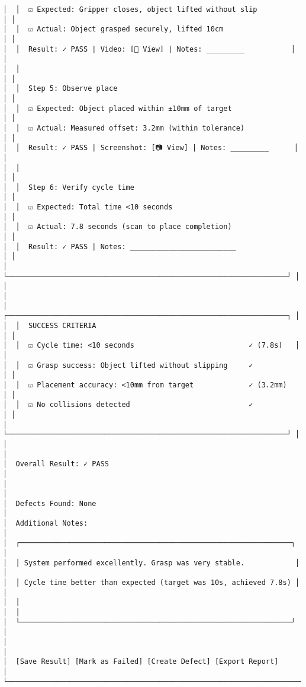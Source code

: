 \documentclass[
]{article}
\begin{document}
\begin{verbatim}
│  │  ☑ Expected: Gripper closes, object lifted without slip          │ │
│  │  ☑ Actual: Object grasped securely, lifted 10cm                  │ │
│  │  Result: ✓ PASS | Video: [🎥 View] | Notes: _________           │ │
│  │                                                                   │ │
│  │  Step 5: Observe place                                           │ │
│  │  ☑ Expected: Object placed within ±10mm of target                │ │
│  │  ☑ Actual: Measured offset: 3.2mm (within tolerance)             │ │
│  │  Result: ✓ PASS | Screenshot: [📷 View] | Notes: _________      │ │
│  │                                                                   │ │
│  │  Step 6: Verify cycle time                                       │ │
│  │  ☑ Expected: Total time <10 seconds                              │ │
│  │  ☑ Actual: 7.8 seconds (scan to place completion)                │ │
│  │  Result: ✓ PASS | Notes: _________________________               │ │
│  └──────────────────────────────────────────────────────────────────┘ │
│                                                                        │
│  ┌──────────────────────────────────────────────────────────────────┐ │
│  │  SUCCESS CRITERIA                                                │ │
│  │  ☑ Cycle time: <10 seconds                           ✓ (7.8s)   │ │
│  │  ☑ Grasp success: Object lifted without slipping     ✓           │ │
│  │  ☑ Placement accuracy: <10mm from target             ✓ (3.2mm)   │ │
│  │  ☑ No collisions detected                            ✓           │ │
│  └──────────────────────────────────────────────────────────────────┘ │
│                                                                        │
│  Overall Result: ✓ PASS                                               │
│                                                                        │
│  Defects Found: None                                                  │
│  Additional Notes:                                                    │
│  ┌────────────────────────────────────────────────────────────────┐  │
│  │ System performed excellently. Grasp was very stable.            │  │
│  │ Cycle time better than expected (target was 10s, achieved 7.8s) │  │
│  │                                                                  │  │
│  └────────────────────────────────────────────────────────────────┘  │
│                                                                        │
│  [Save Result] [Mark as Failed] [Create Defect] [Export Report]       │
└────────────────────────────────────────────────────────────────────────┘
\end{verbatim}
\end{document}
